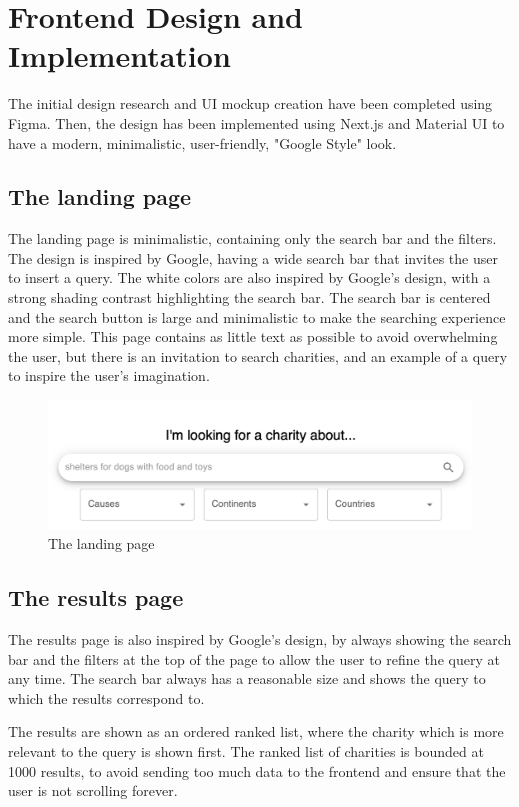 \documentclass[unicode,9pt,a4paper,oneside,numbers=endperiod,openany]{scrartcl}
\begin{document}
\section{Frontend Design and Implementation}

The initial design research and UI mockup creation have been completed using Figma. 
Then, the design has been implemented using Next.js and Material UI to have a modern, minimalistic, user-friendly,  "Google Style" look.

\subsection{The landing page}

The landing page is minimalistic, containing only the search bar and the filters. The design is inspired by Google, having a wide search bar that invites the user to insert a query.
The white colors are also inspired by Google's design, with a strong shading contrast highlighting the search bar.
The search bar is centered and the search button is large and minimalistic to make the searching experience more simple.
This page contains as little text as possible to avoid overwhelming the user, but there is an invitation to search charities, and an example of a query to inspire the user's imagination.

\begin{figure}[h]
    \centering
    \includegraphics[width=0.6\linewidth]{fig/main-page.png}
    \caption{The landing page}
\end{figure}


\subsection{The results page}

The results page is also inspired by Google's design, by always showing the search bar and the filters at the top of the page to 
allow the user to refine the query at any time. The search bar always has a reasonable size and shows the query to which the results correspond to.

The results are shown as an ordered ranked list, where the charity which is more relevant to the query is shown first.
The ranked list of charities is bounded at 1000 results, to avoid 
sending too much data to the frontend and ensure that the user is not scrolling forever.
\end{document}
